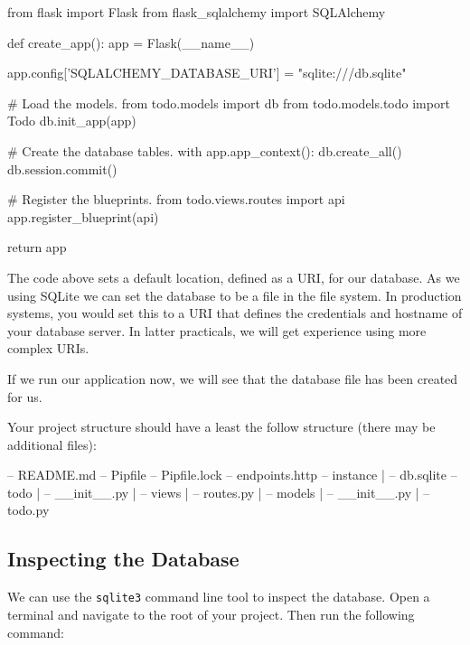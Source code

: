 \documentclass{csse4400}
\begin{document}
\begin{code}[language=python,numbers=none]{}
from flask import Flask
from flask_sqlalchemy import SQLAlchemy

def create_app():
    app = Flask(__name__)

    app.config['SQLALCHEMY_DATABASE_URI'] = "sqlite:///db.sqlite"

    # Load the models.
    from todo.models import db
    from todo.models.todo import Todo
    db.init_app(app)

    # Create the database tables.
    with app.app_context():
        db.create_all()
        db.session.commit()

    # Register the blueprints.
    from todo.views.routes import api
    app.register_blueprint(api)

    return app
\end{code}

The code above sets a default location, defined as a URI, for our database.
As we using SQLite we can set the database to be a file in the file system.
In production systems, you would set this to a URI that defines the credentials and hostname of your database server.
In latter practicals, we will get experience using more complex URIs.

If we run our application now, we will see that the database file has been created for us.

\pagebreak

Your project structure should have a least the follow structure (there may be additional files):

\begin{code}[language=bash,numbers=none]{}
-- README.md
-- Pipfile
-- Pipfile.lock
-- endpoints.http
-- instance
  | -- db.sqlite
-- todo
  | -- __init__.py
  | -- views
      | -- routes.py
  | -- models
      | -- __init__.py
      | -- todo.py
\end{code}

\subsection{Inspecting the Database}


We can use the \texttt{sqlite3} command line tool to inspect the database.
Open a terminal and navigate to the root of your project.
Then run the following command:
\end{document}
